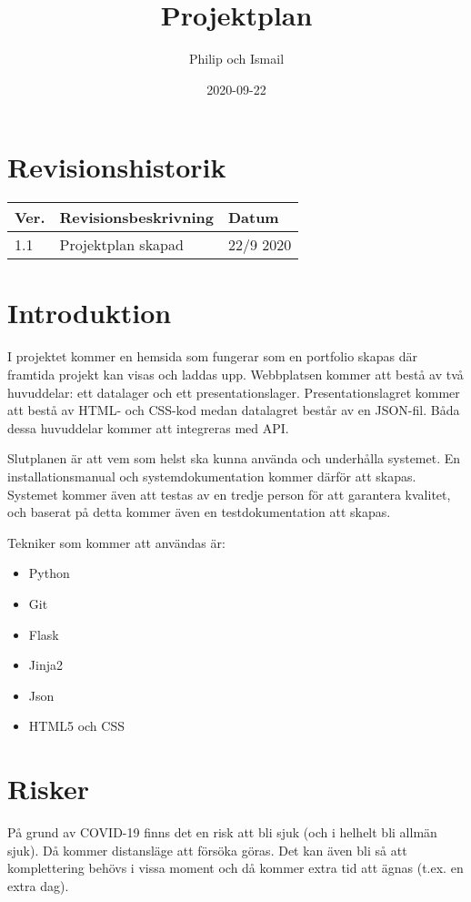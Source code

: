 \documentclass{TDP003mall}
\author{Philip och Ismail}
\title{Projektplan}
\date{2020-09-22}
\begin{document}
\projectpage

\tableofcontents
\newpage

\section{Revisionshistorik}
\begin{table}[!h]
\begin{tabularx}{\linewidth}{|l|X|l|}
\hline
Ver. & Revisionsbeskrivning & Datum \\\hline
1.1 & Projektplan skapad & 22/9 2020 \\\hline
\end{tabularx}
\end{table}


\section{Introduktion}
I projektet kommer en hemsida som fungerar som en portfolio skapas där framtida projekt kan visas och laddas upp. Webbplatsen kommer att bestå av två huvuddelar: ett datalager och ett presentationslager. Presentationslagret kommer att bestå av HTML- och CSS-kod medan datalagret består av en JSON-fil. Båda dessa huvuddelar kommer att integreras med API.

Slutplanen är att vem som helst ska kunna använda och underhålla systemet. En installationsmanual och systemdokumentation kommer därför att skapas. Systemet kommer även att testas av en tredje person för att garantera kvalitet, och baserat på detta kommer även en testdokumentation att skapas.

Tekniker som kommer att användas är:

\begin{itemize}
\item
  Python
\item
  Git
\item
  Flask
\item
  Jinja2
\item
  Json
\item
  HTML5 och CSS
\end{itemize}

\section{Risker}
På grund av COVID-19 finns det en risk att bli sjuk (och i helhelt bli allmän sjuk). Då kommer distansläge att försöka göras. Det kan även bli så att komplettering behövs i vissa moment och då kommer extra tid att ägnas (t.ex. en extra dag).
\end{document}
